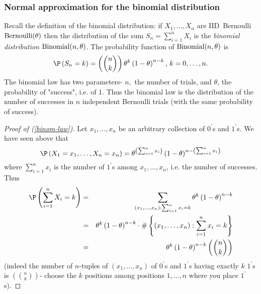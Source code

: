 \subsubsection{Normal approximation for the binomial distribution}

Recall the definition of the binomial distribution: if $X_{1},\ldots ,X_{n}$
are IID\ Bernoulli $\mbox{{\rm Bernoulli}}(\theta)$ then the distribution of the sum $%
S_{n}=\sum_{i=1}^{n}X_{i}$ is the \textit{binomial distribution} $\mbox{{\rm Binomial}}(n,\theta)$.
The probability function of $\mbox{{\rm Binomial}}(n,\theta)$ is 
\begin{equation}
\P \left( S_{n}=k\right) =\left( \binom{n}{k}\right) \theta^{k}\left( 1-\theta\right)
^{n-k}\text{, }k=0,\ldots ,n.  \label{binom-law}
\end{equation}%
The binomial law has two parameters- $n,$ the number of trials, and $\theta$, the
probability of "success", i.e. of $1$. Thus the binomial law is the
distribution of the number of successes in $n$ independent Bernoulli trials
(with the same probability of success).

\bigskip

\begin{proof}[Proof of (\protect\ref{binom-law})]
Let $x_{1},\ldots ,x_{n}$ be an arbitrary collection of $0^{\prime }$s and $%
1^{\prime }$s$.$ We have seen above that 
\begin{equation*}
\P \left( X_{1}=x_{1},\ldots ,X_{n}=x_{n}\right) =\theta^{\left(
\sum_{i=1}^{n}x_{i}\right) }\left( 1-\theta\right) ^{n-\left(
\sum_{i=1}^{n}x_{i}\right) }
\end{equation*}%
where $\sum_{i=1}^{n}x_{i}$ is the number of $1^{\prime }$s among $%
x_{1},\ldots ,x_{n}$, i.e. the number of successes. Thus 
\begin{eqnarray*}
\P \left( \sum_{i=1}^{n}X_{i}=k\right) &=&\sum_{\left( x_{1},\ldots
,x_{n}\right) :\sum_{i=1}^{n}x_{i}=k}\theta^{k}\left( 1-\theta\right) ^{n-k} \\
&=&\theta^{k}\left( 1-\theta\right) ^{n-k}\cdot \#\left\{ \left( x_{1},\ldots
,x_{n}\right) :\sum_{i=1}^{n}x_{i}=k\right\} \\
&=&\theta^{k}\left( 1-\theta\right) ^{n-k}\left( \binom{n}{k}\right)
\end{eqnarray*}%
(indeed the number of $n$-tuples of $\left( x_{1},\ldots ,x_{n}\right) $ of $%
0^{\prime }$s and $1^{\prime }$s having exactly $k$ $1^{\prime }$s is $%
\left( \binom{n}{k}\right) $- choose the $k$ positions among positions $%
1,\ldots ,n$ where you place $1^{\prime }$s).
\end{proof}

